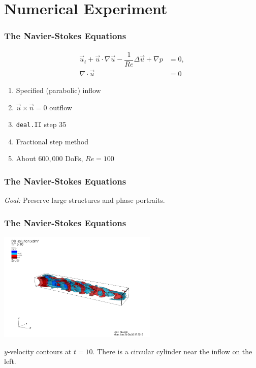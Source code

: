 \documentclass[mathserif]{beamer}
\begin{document}
\section{Numerical Experiment}
\begin{frame}
    \frametitle{The Navier-Stokes Equations}
    \begin{equation}
        \begin{aligned}
            \vec{u}_t + \vec{u} \cdot \nabla \vec{u} - \dfrac{1}{Re} \Delta \vec{u}
            + \nabla p &= 0,                                                  \\
            \nabla \cdot \vec{u} &= 0
        \end{aligned}
    \end{equation}
    \begin{enumerate}
        \item Specified (parabolic) inflow
        \item \(\vec{u} \times \vec{n} = 0\) outflow
        \item \texttt{deal.II} step 35 \cite{dealii81, guermond05}
        \item Fractional step method
        \item About \(600,000\) DoFs, \(Re = 100\)
    \end{enumerate}
\end{frame}

\begin{frame}
    \frametitle{The Navier-Stokes Equations}
    \begin{center}
        \emph{Goal:} Preserve large structures and phase portraits.
    \end{center}
\end{frame}

\begin{frame}
    \frametitle{The Navier-Stokes Equations}
    \begin{center}
        \includegraphics[width=3in]{../Pictures/NSE/ns-movie1000.png}

        \(y\)-velocity contours at \(t = 10\). There is a circular cylinder near
        the inflow on the left.
    \end{center}
\end{frame}
\end{document}
